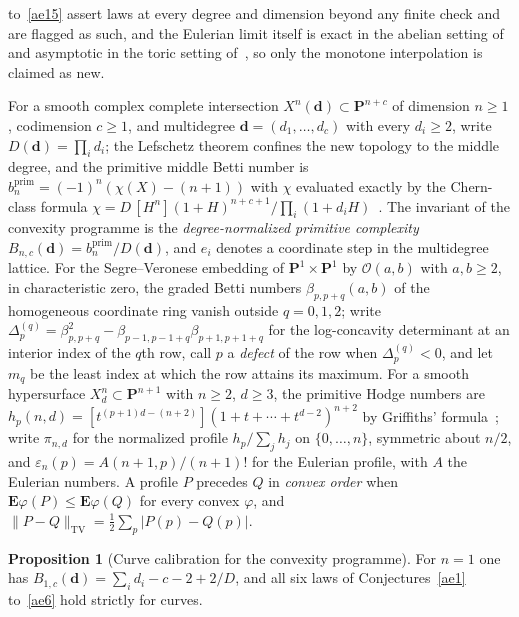 \documentclass[11pt]{article}
\theoremstyle{definition}
\newtheorem{proposition}{Proposition}
\begin{document}
to~\ref{ae15} assert laws at every degree and dimension beyond any finite check and are flagged as such, and the Eulerian limit itself is exact in the abelian setting of~\cite{LS25} and asymptotic in the toric setting of~\cite{DK86}, so only the monotone interpolation is claimed as new.

For a smooth complex complete intersection $X^n(\mathbf d)\subset\mathbf P^{n+c}$ of dimension $n\ge1$, codimension $c\ge1$, and multidegree $\mathbf d=(d_1,\ldots,d_c)$ with every $d_i\ge2$, write $D(\mathbf d)=\prod_id_i$; the Lefschetz theorem confines the new topology to the middle degree, and the primitive middle Betti number is $b_n^{\mathrm{prim}}=(-1)^n(\chi(X)-(n+1))$ with $\chi$ evaluated exactly by the Chern-class formula $\chi=D\,[H^n](1+H)^{n+c+1}/\prod_i(1+d_iH)$~\cite{GL02,CO74}.  The invariant of the convexity programme is the \emph{degree-normalized primitive complexity} $B_{n,c}(\mathbf d)=b_n^{\mathrm{prim}}/D(\mathbf d)$, and $e_i$ denotes a coordinate step in the multidegree lattice.  For the Segre--Veronese embedding of $\mathbf P^1\times\mathbf P^1$ by $\mathcal O(a,b)$ with $a,b\ge2$, in characteristic zero, the graded Betti numbers $\beta_{p,p+q}(a,b)$ of the homogeneous coordinate ring vanish outside $q=0,1,2$; write $\Delta^{(q)}_p=\beta_{p,p+q}^2-\beta_{p-1,p-1+q}\beta_{p+1,p+1+q}$ for the log-concavity determinant at an interior index of the $q$th row, call $p$ a \emph{defect} of the row when $\Delta^{(q)}_p<0$, and let $m_q$ be the least index at which the row attains its maximum.  For a smooth hypersurface $X^n_d\subset\mathbf P^{n+1}$ with $n\ge2$, $d\ge3$, the primitive Hodge numbers are $h_p(n,d)=[t^{(p+1)d-(n+2)}](1+t+\cdots+t^{d-2})^{n+2}$ by Griffiths' formula~\cite{Gri69}; write $\pi_{n,d}$ for the normalized profile $h_p/\sum_jh_j$ on $\{0,\ldots,n\}$, symmetric about $n/2$, and $\varepsilon_n(p)=A(n+1,p)/(n+1)!$ for the Eulerian profile, with $A$ the Eulerian numbers.  A profile $P$ precedes $Q$ in \emph{convex order} when $\mathbf E\varphi(P)\le\mathbf E\varphi(Q)$ for every convex $\varphi$, and $\|P-Q\|_{\mathrm{TV}}=\tfrac12\sum_p|P(p)-Q(p)|$.

\begin{proposition}[Curve calibration for the convexity programme]\label{ae:curve}
For $n=1$ one has $B_{1,c}(\mathbf d)=\sum_id_i-c-2+2/D$, and all six laws of Conjectures~\ref{ae1} to~\ref{ae6} hold strictly for curves.
\end{proposition}
\end{document}

